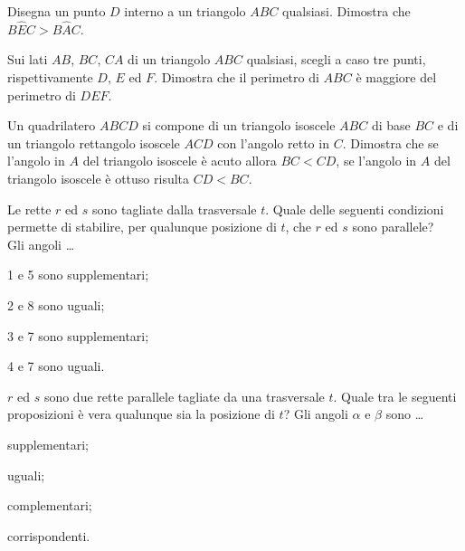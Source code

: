 \begin{multicols}{2}
\begin{esercizio}
\label{ese:3.106}
Disegna un punto $D$ interno a un triangolo $ABC$ qualsiasi. Dimostra che $B\widehat{E}C>B\widehat{A}C$.
\end{esercizio}

\begin{esercizio}
\label{ese:3.107}
Sui lati $AB$, $BC$, $CA$ di un triangolo $ABC$ qualsiasi, scegli a caso tre punti, rispettivamente $D$, $E$ ed $F$. Dimostra che il perimetro di $ABC$ è maggiore del perimetro di $DEF$.
\end{esercizio}

\begin{esercizio}
\label{ese:3.108}
Un quadrilatero $ABCD$ si compone di un triangolo isoscele $ABC$ di base $BC$ e di un triangolo rettangolo isoscele $ACD$ con l'angolo retto in $C$. Dimostra che se l'angolo in $A$ del triangolo isoscele è acuto allora $BC<CD$, se l'angolo in $A$ del triangolo isoscele è ottuso risulta $CD<BC$.
\end{esercizio}

\end{multicols}

\begin{esercizio}
\label{ese:3.109}
Le rette $r$ ed $s$ sono tagliate dalla trasversale $t$. Quale delle seguenti condizioni permette di stabilire, per qualunque posizione di $t$, che $r$ ed $s$ sono parallele?\\
Gli angoli \ldots{}
\begin{enumeratea}
\item 1 e 5 sono supplementari;
\item 2 e 8 sono uguali;
\item 3 e 7 sono supplementari;
\item 4 e 7 sono uguali.
\end{enumeratea}
\end{esercizio}

\begin{esercizio}
\label{ese:3.110}
$r$ ed $s$ sono due rette parallele tagliate da una trasversale $t$. Quale tra le seguenti proposizioni è vera qualunque sia la posizione di $t$?
Gli angoli $\alpha$ e $\beta$ sono \ldots{}
\begin{enumeratea}
\item supplementari;
\item uguali;
\item complementari;
\item corrispondenti.
\end{enumeratea}
\end{esercizio}

